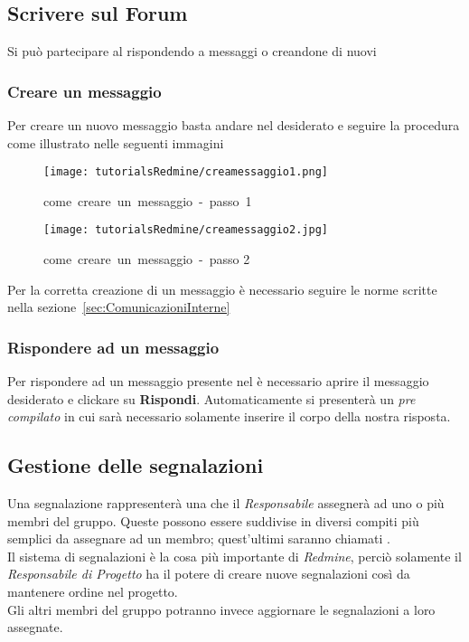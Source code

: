 \documentclass{scalatekids-article}
\begin{document}
\subsection{Scrivere sul Forum}

Si può partecipare al  rispondendo a messaggi o creandone di nuovi

\subsubsection{Creare un messaggio}

Per creare un nuovo messaggio basta andare nel  desiderato e seguire la procedura come illustrato nelle seguenti immagini
\begin{figure}[H]
  \centering
  \texttt{[image: tutorialsRedmine/creamessaggio1.png]}
  \caption{come\ creare\ un\ messaggio\ -\ passo\ 1}
\end{figure}
\begin{figure}[H]
  \centering
  \texttt{[image: tutorialsRedmine/creamessaggio2.jpg]}
  \caption{come\ creare\ un\ messaggio\ -\ passo 2}
\end{figure}
Per la corretta creazione di un messaggio è necessario seguire le norme scritte nella sezione~\ref{sec:ComunicazioniInterne}

\subsubsection{Rispondere ad un messaggio}

Per rispondere ad un messaggio presente nel  è necessario aprire il messaggio desiderato e clickare su \textbf{Rispondi}. Automaticamente si presenterà un  \textit{pre compilato} in cui sarà necessario solamente inserire il corpo della nostra risposta.

\subsection{Gestione delle segnalazioni}

Una segnalazione rappresenterà una  che il \textit{Responsabile} assegnerà ad uno o più membri del gruppo. Queste  possono essere suddivise in diversi compiti più semplici da assegnare ad un membro; quest'ultimi saranno chiamati .\\
Il sistema di segnalazioni è la cosa più importante di \textit{Redmine}, perciò solamente il \textit{Responsabile di Progetto} ha il potere di creare nuove segnalazioni così da mantenere ordine nel progetto. \\Gli altri membri del gruppo potranno invece aggiornare le segnalazioni a loro assegnate.
\end{document}
